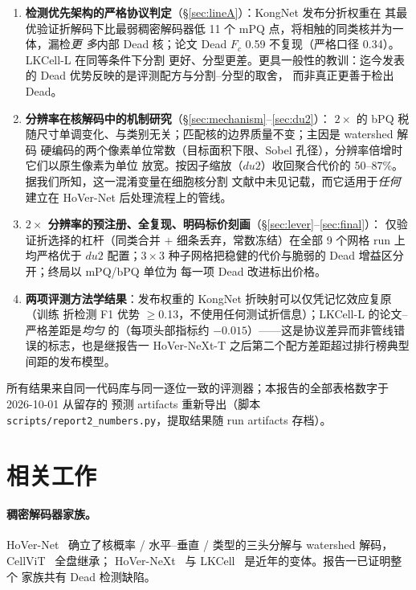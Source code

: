 \documentclass[11pt]{article}
\begin{document}
\begin{enumerate}
\item \textbf{检测优先架构的严格协议判定}（\S\ref{sec:lineA}）：KongNet 发布分折权重在
其最优验证折解码下比最弱稠密解码器低 11 个 mPQ 点，将相触的同类核并为一体，漏检\emph{更
多}内部 Dead 核；论文 Dead $F_c$ 0.59 不复现（严格口径 0.34）。LKCell-L 在同等条件下分割
更好、分型更差。更具一般性的教训：迄今发表的 Dead 优势反映的是评测配方与分割--分型的取舍，
而非真正更善于检出 Dead。
\item \textbf{分辨率在核解码中的机制研究}（\S\ref{sec:mechanism}--\ref{sec:du2}）：
$2\times$ 的 bPQ 税随尺寸单调变化、与类别无关；匹配核的边界质量不变；主因是 watershed 解码
硬编码的两个像素单位常数（目标面积下限、Sobel 孔径），分辨率倍增时它们以原生像素为单位
放宽。按因子缩放（$du2$）收回聚合代价的 50--87\%。据我们所知，这一混淆变量在细胞核分割
文献中未见记载，而它适用于\emph{任何}建立在 HoVer-Net 后处理流程上的管线。
\item \textbf{$2\times$ 分辨率的预注册、全复现、明码标价刻画}（\S\ref{sec:lever}--\ref{sec:final}）：
仅验证折选择的杠杆（同类合并 $+$ 细条丢弃，常数冻结）在全部 9 个网格 run 上均严格优于
$du2$ 配置；$3{\times}3$ 种子网格把稳健的代价与脆弱的 Dead 增益区分开；终局以 mPQ/bPQ 单位为
每一项 Dead 改进标出价格。
\item \textbf{两项评测方法学结果}：发布权重的 KongNet 折映射可以仅凭记忆效应复原（训练
折检测 F1 优势 $\geq$0.13，不使用任何测试折信息）；LKCell-L 的论文--严格差距是\emph{均匀}
的（每项头部指标约 $-0.015$）——这是协议差异而非管线错误的标志，也是继报告一 HoVer-NeXt-T
之后第二个配方差距超过排行榜典型间距的发布模型。
\end{enumerate}

所有结果来自同一代码库与同一逐位一致的评测器；本报告的全部表格数字于 2026-10-01 从留存的
预测 artifacts 重新导出（脚本 \texttt{scripts/report2\_numbers.py}，提取结果随 run
artifacts 存档）。

\section{相关工作}
\label{sec:related}

\paragraph{稠密解码器家族。}HoVer-Net~\cite{graham2019hovernet} 确立了核概率 / 水平--垂直
/ 类型的三头分解与 watershed 解码，CellViT~\cite{horta2024cellvit} 全盘继承；
HoVer-NeXt~\cite{hovenext} 与 LKCell~\cite{cui2024lkcell} 是近年的变体。报告一已证明整个
家族共有 Dead 检测缺陷。
\end{document}
